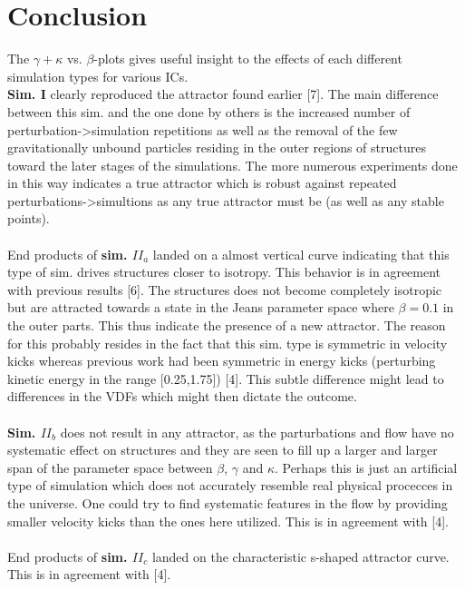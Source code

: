 \section{Conclusion}
The $\gamma + \kappa$ vs. $\beta$-plots gives useful insight to the effects of each different simulation types for various ICs. \\
\textbf{Sim. I} clearly reproduced the attractor found earlier [7]. The main difference between this sim. and the one done by others is the increased number of perturbation->simulation repetitions as well as the removal of the few gravitationally unbound particles residing in the outer regions of structures toward the later stages of the simulations. The more numerous experiments done in this way indicates a true attractor which is robust against repeated perturbations->simultions as any true attractor must be (as well as any stable points).  \\ \\

End products of \textbf{sim. $II_a$} landed on a almost vertical curve indicating that this type of sim. drives structures closer to isotropy. This behavior is in agreement with previous results [6]. The structures does not become completely isotropic but are attracted towards a state in the Jeans parameter space where $\beta = 0.1$ in the outer parts. This thus indicate the presence of a new attractor. The reason for this probably resides in the fact that this sim. type is symmetric in velocity kicks whereas previous work had been symmetric in energy kicks (perturbing kinetic energy in the range [0.25,1.75]) [4]. This subtle difference might lead to differences in the VDFs which might then dictate the outcome. \\ \\

\textbf{Sim. $II_b$} does not result in any attractor, as the parturbations and flow have no systematic effect on structures and they are seen to fill up a larger and larger span of the parameter space between $\beta$, $\gamma$ and $\kappa$. Perhaps this is just an artificial type of simulation which does not accurately resemble real physical procecces in the universe. One could try to find systematic features in the flow by providing smaller velocity kicks than the ones here utilized. This is in agreement with [4]. \\ \\

End products of \textbf{sim. $II_c$} landed on the characteristic s-shaped attractor curve. This is in agreement with [4]. \\ \\

